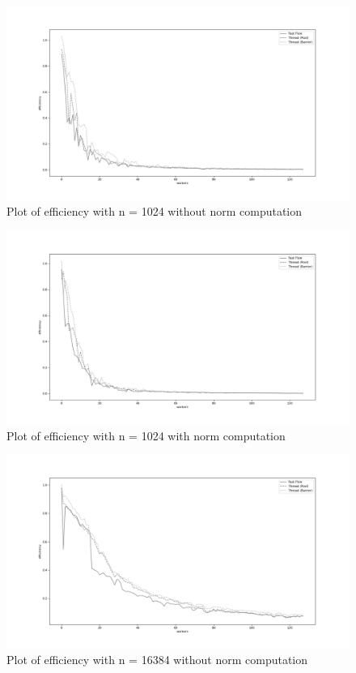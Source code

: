 \documentclass[12pt]{extarticle}
\begin{document}

\begin{figure}[H]
\centering
    \includegraphics[width=18cm, center]{./plots/efficiency_1024_0.png}
    \caption{Plot of efficiency with n = 1024 without norm computation}
\end{figure}

\begin{figure}[H]
\centering
    \includegraphics[width=18cm, center]{./plots/efficiency_1024_1.png}
    \caption{Plot of efficiency with n = 1024 with norm computation}
\end{figure} 

\begin{figure}[H]
\centering
    \includegraphics[width=18cm, center]{./plots/efficiency_16384_0.png}
    \caption{Plot of efficiency with n = 16384 without norm computation}
\end{figure} 
\end{document}
